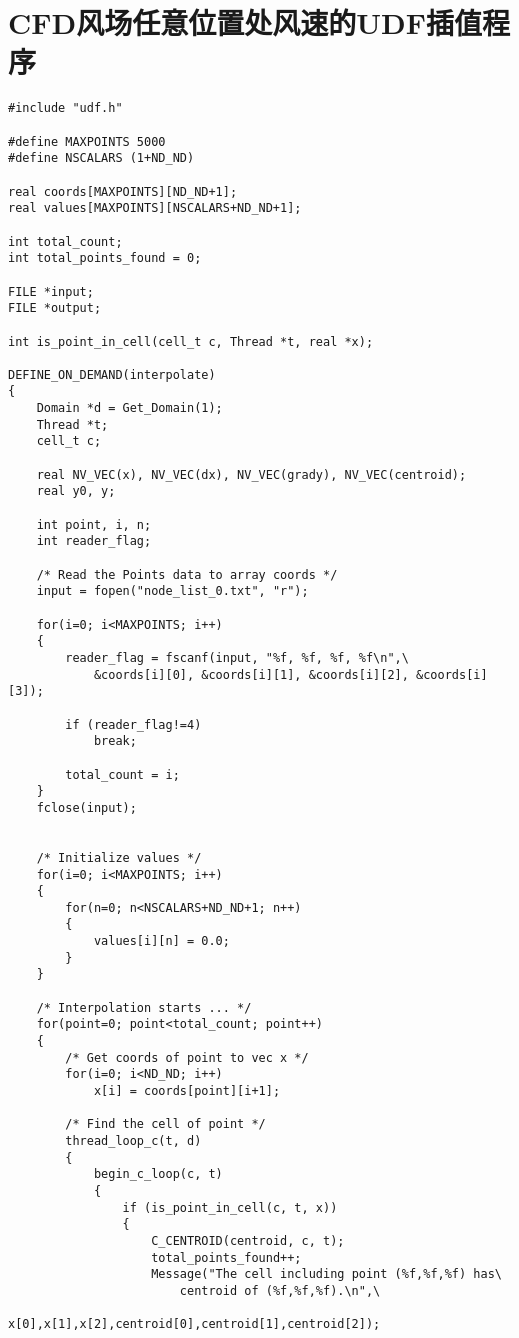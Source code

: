 \chapter{CFD风场任意位置处风速的UDF插值程序}\label{apen:inter}
\begin{verbatim}
#include "udf.h"

#define MAXPOINTS 5000
#define NSCALARS (1+ND_ND)

real coords[MAXPOINTS][ND_ND+1];
real values[MAXPOINTS][NSCALARS+ND_ND+1];

int total_count;
int total_points_found = 0;

FILE *input;
FILE *output;

int is_point_in_cell(cell_t c, Thread *t, real *x);

DEFINE_ON_DEMAND(interpolate)
{
    Domain *d = Get_Domain(1);
    Thread *t;
    cell_t c;

    real NV_VEC(x), NV_VEC(dx), NV_VEC(grady), NV_VEC(centroid);
    real y0, y;

    int point, i, n;
    int reader_flag;

    /* Read the Points data to array coords */
    input = fopen("node_list_0.txt", "r");

    for(i=0; i<MAXPOINTS; i++)
    {
        reader_flag = fscanf(input, "%f, %f, %f, %f\n",\
            &coords[i][0], &coords[i][1], &coords[i][2], &coords[i][3]);

        if (reader_flag!=4)
            break;

        total_count = i;
    }
    fclose(input);


    /* Initialize values */
    for(i=0; i<MAXPOINTS; i++)
    {
        for(n=0; n<NSCALARS+ND_ND+1; n++)
        {
            values[i][n] = 0.0;
        }
    }
    
    /* Interpolation starts ... */
    for(point=0; point<total_count; point++)
    {
        /* Get coords of point to vec x */
        for(i=0; i<ND_ND; i++)
            x[i] = coords[point][i+1];

        /* Find the cell of point */
        thread_loop_c(t, d)
        {
            begin_c_loop(c, t)
            {
                if (is_point_in_cell(c, t, x))
                {
                    C_CENTROID(centroid, c, t);
                    total_points_found++;
                    Message("The cell including point (%f,%f,%f) has\
                        centroid of (%f,%f,%f).\n",\
                        x[0],x[1],x[2],centroid[0],centroid[1],centroid[2]);


\end{verbatim}
